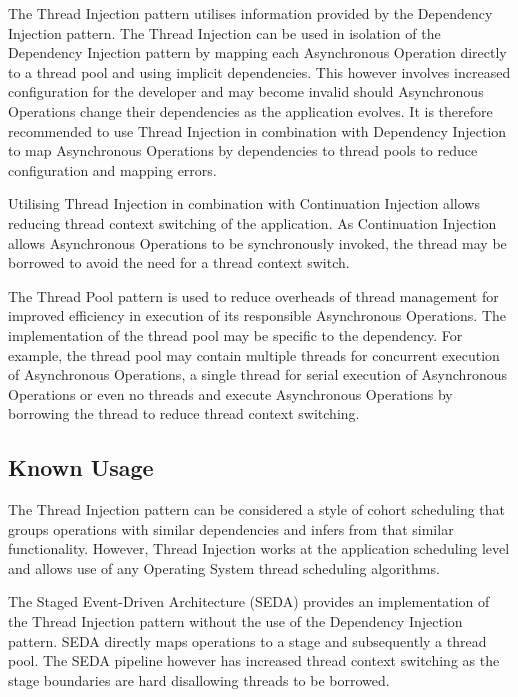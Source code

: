 \documentclass[prodmode]{style/acmlarge}
\begin{document}
The Thread Injection pattern utilises information provided by the Dependency
Injection pattern.  The Thread Injection can be used in isolation of the
Dependency Injection pattern by mapping each Asynchronous Operation directly to
a thread pool and using implicit dependencies.  This however involves increased
configuration for the developer and may become invalid should Asynchronous
Operations change their dependencies as the application evolves.  It is
therefore recommended to use Thread Injection in combination with Dependency
Injection to map Asynchronous Operations by dependencies to thread pools to
reduce configuration and mapping errors.

Utilising Thread Injection in combination with Continuation Injection allows
reducing thread context switching of the application.  As Continuation Injection
allows Asynchronous Operations to be synchronously invoked, the thread may be
borrowed to avoid the need for a thread context switch.

The Thread Pool pattern \cite{thread-per-request} is used to reduce overheads of
thread management for improved efficiency in execution of its responsible
Asynchronous Operations.  The implementation of the thread pool may be specific
to the dependency.  For example, the thread pool may contain multiple threads
for concurrent execution of Asynchronous Operations, a single thread for serial
execution of Asynchronous Operations or even no threads and execute Asynchronous
Operations by borrowing the thread to reduce thread context switching.


\subsection{Known Usage}

The Thread Injection pattern can be considered a style of cohort scheduling
\cite{cohort} that groups operations with similar dependencies and infers from
that similar functionality.  However, Thread Injection works at the application
scheduling level and allows use of any Operating System thread scheduling
algorithms.

The Staged Event-Driven Architecture (SEDA) \cite{seda} provides an
implementation of the Thread Injection pattern without the use of the Dependency
Injection pattern.  SEDA directly maps operations to a stage and subsequently a
thread pool.  The SEDA pipeline however has increased thread context switching
as the stage boundaries are hard disallowing threads to be borrowed.
\end{document}
